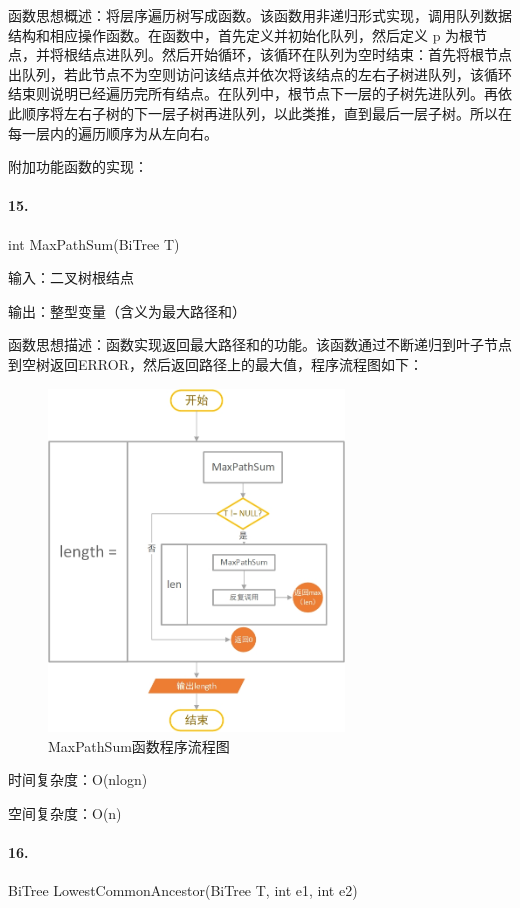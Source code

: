 \documentclass[supercite]{Experimental_Report}
\theoremstyle{definition}
\begin{document}
函数思想概述：将层序遍历树写成函数。该函数用非递归形式实现，调用队列数据结构和相应操作函数。在函数中，首先定义并初始化队列，然后定义 p 为根节点，并将根结点进队列。然后开始循环，该循环在队列为空时结束：首先将根节点出队列，若此节点不为空则访问该结点并依次将该结点的左右子树进队列，该循环结束则说明已经遍历完所有结点。在队列中，根节点下一层的子树先进队列。再依此顺序将左右子树的下一层子树再进队列，以此类推，直到最后一层子树。所以在每一层内的遍历顺序为从左向右。

附加功能函数的实现：

\paragraph{15.}int MaxPathSum(BiTree T)

输入：二叉树根结点

输出：整型变量（含义为最大路径和）

函数思想描述：函数实现返回最大路径和的功能。该函数通过不断递归到叶子节点到空树返回ERROR，然后返回路径上的最大值，程序流程图如下：

 \begin{figure}[H]
 	\centering
 	\includegraphics[width=0.7\textwidth]{images/最大流程.jpg}
 	\caption{MaxPathSum函数程序流程图}
 	\label{txlab}
 \end{figure}

时间复杂度：O(nlogn)

空间复杂度：O(n)

\paragraph{16.}BiTree LowestCommonAncestor(BiTree T, int e1, int e2)
\end{document}
